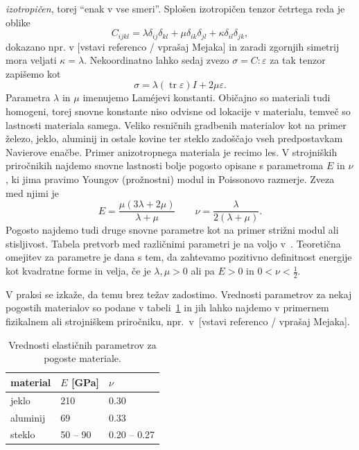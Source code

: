 \documentclass[a4paper,twoside]{article}
\theoremstyle{definition} %
\theoremstyle{plain} %
\numberwithin{equation}{section}
\newcommand{\eps}{\varepsilon}
\newcommand{\ts}{\sigma}
\DeclareMathOperator{\tr}{tr}
\begin{document}
\emph{izotropičen}, torej ``enak v vse smeri''. Splošen izotropičen tenzor
četrtega reda je oblike
\[
  C_{ijkl} = \lambda \delta_{ij}\delta_{kl} + \mu \delta_{ik}\delta_{jl} +
  \kappa \delta_{il}\delta_{jk},
\]
dokazano npr. v [vstavi referenco / vprašaj Mejaka] in zaradi zgornjih simetrij
mora veljati $\kappa = \lambda$.
Nekoordinatno lahko sedaj zvezo $\ts = C:\eps$ za tak tenzor zapišemo kot
\begin{equation}
  \ts = \lambda (\tr\eps)I + 2\mu \eps.
  \label{eq:hooke-isotropic}
\end{equation}
Parametra $\lambda$ in $\mu$ imenujemo Lam\'{e}jevi konstanti.
Običajno so materiali tudi homogeni, torej snovne konstante niso odvisne od
lokacije v materialu, temveč so lastnosti materiala samega.
Veliko resničnih gradbenih materialov kot na primer železo, jeklo, aluminij in
ostale kovine ter steklo zadoščajo vseh predpostavkam Navierove enačbe. Primer
anizotropnega materiala je recimo les.  V strojniških priročnikih najdemo snovne
lastnosti bolje pogosto opisane s parametroma $E$ in $\nu$, ki jima pravimo
Youngov (prožnostni) modul in Poissonovo razmerje. Zveza med njimi je
\[
  E = \frac{\mu(3\lambda+2\mu)}{\lambda+\mu} \qquad \nu =
  \frac{\lambda}{2(\lambda+\mu)}.
\]
Pogosto najdemo tudi druge snovne parametre kot na primer strižni modul ali
stisljivost. Tabela pretvorb med različnimi parametri je na voljo v~\cite[tabela
5.1, str.\ 215]{slaughter2012linearized}. Teoretična omejitev za parametre je
dana s tem, da zahtevamo pozitivno definitnost energije kot kvadratne forme in
velja, če je $\lambda, \mu > 0$ ali pa $E > 0$ in $0 < \nu < \frac12$.

V praksi se izkaže, da temu brez težav zadostimo. Vrednosti parametrov za nekaj
pogostih materialov so podane v tabeli~\ref{tab:Enu} in jih lahko najdemo v
primernem fizikalnem ali strojniškem priročniku, npr.\ v~[vstavi referenco / vprašaj
Mejaka].
\begin{table}[h]
  \centering
  \begin{tabular}{|l|l|l|} \hline
    material & $E$ [\unit{GPa}] & $\nu$ \\ \hline
    jeklo    & 210 & 0.30 \\
    aluminij & 69 & 0.33 \\
    steklo   & 50 -- 90 & 0.20 -- 0.27 \\ \hline
  \end{tabular}
  \caption{Vrednosti elastičnih parametrov za pogoste materiale.}
  \label{tab:Enu}
\end{table}
\end{document}
